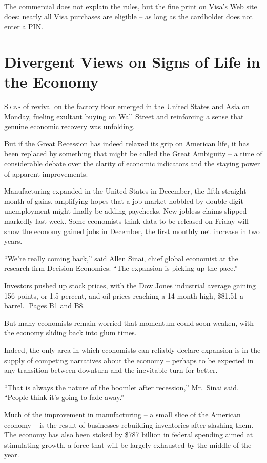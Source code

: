 ﻿\documentclass[12pt]{article}
\begin{document}
The commercial does not explain the rules, but the fine print on Visa's Web site does: nearly all
Visa purchases are eligible -- as long as the cardholder does not enter a PIN.

\section{Divergent Views on Signs of Life in the Economy}

\lettrine{S}{igns} of revival on the factory floor emerged in the United
States and Asia on Monday, fueling exultant buying on Wall Street and reinforcing a sense that
genuine economic recovery was unfolding.

But if the Great Recession has indeed relaxed its grip on American life, it has been replaced by
something that might be called the Great Ambiguity -- a time of considerable debate over the clarity
of economic indicators and the staying power of apparent improvements.

Manufacturing expanded in the United States in December, the fifth straight month of gains,
amplifying hopes that a job market hobbled by double-digit unemployment might finally be adding
paychecks. New jobless claims slipped markedly last week. Some economists think data to be released
on Friday will show the economy gained jobs in December, the first monthly net increase in two
years.

``We're really coming back,'' said Allen Sinai, chief global economist at the research firm Decision
Economics. ``The expansion is picking up the pace.''

Investors pushed up stock prices, with the Dow Jones industrial average gaining 156 points, or 1.5
percent, and oil prices reaching a 14-month high, \$81.51 a barrel. $[$Pages B1 and B8.$]$

But many economists remain worried that momentum could soon weaken, with the economy sliding back
into glum times.

Indeed, the only area in which economists can reliably declare expansion is in the supply of
competing narratives about the economy -- perhaps to be expected in any transition between downturn
and the inevitable turn for better.

``That is always the nature of the boomlet after recession,'' Mr.~Sinai said. ``People think it's
going to fade away.''

Much of the improvement in manufacturing -- a small slice of the American economy -- is the result
of businesses rebuilding inventories after slashing them. The economy has also been stoked by \$787
billion in federal spending aimed at stimulating growth, a force that will be largely exhausted by
the middle of the year.
\end{document}

